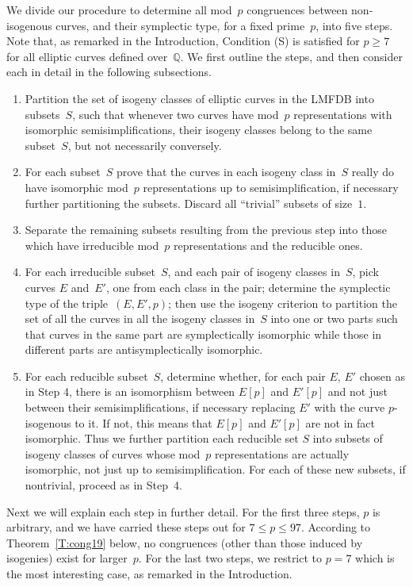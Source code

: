 \documentclass[twoside,leqno,symbols-for-thanks, draft]{rmi}
\numberwithin{equation}{section}
\newcommand{\Q}{\mathbb{Q}}
\theoremstyle{remark}
\begin{document}
We divide our procedure to determine all mod~$p$ congruences between
non-isogenous curves, and their symplectic type, for a fixed
prime~$p$, into five steps.  Note that, as remarked in the
Introduction, Condition (S) is satisfied for $p\ge7$ for all elliptic
curves defined over~$\Q$.  We first outline the steps, and then
consider each in detail in the following subsections.
\begin{enumerate}[1.]
\item Partition the set of isogeny classes of elliptic curves in the LMFDB
  into subsets~$S$, such that whenever two curves have mod~$p$
  representations with isomorphic semisimplifications, their isogeny
  classes belong to the same subset~$S$, but not necessarily
  conversely.
\item For each subset~$S$ prove that the curves in each isogeny class in~$S$ really
  do have isomorphic mod~$p$ representations up to
  semisimplification, if necessary further partitioning the subsets.
  Discard all ``trivial'' subsets of size~$1$.
\item Separate the remaining subsets resulting from the previous
  step into those which have irreducible mod~$p$ representations and
  the reducible ones.
\item For each irreducible subset~$S$, and each pair of isogeny
  classes in~$S$, pick curves $E$ and~$E'$, one from each class in the
  pair; determine the symplectic type of the triple~$(E,E',p)$; then
  use the isogeny criterion to partition the set of all the curves in
  all the isogeny classes in~$S$ into one or two parts such that curves
  in the same part are symplectically isomorphic while those in
  different parts are antisymplectically isomorphic.
\item For each reducible subset~$S$, determine whether, for each pair
  $E$, $E'$ chosen as in Step 4, there is an isomorphism between
  $E[p]$ and $E'[p]$ and not just between their semisimplifications,
  if necessary replacing $E'$ with the curve $p$-isogenous to it.  If
  not, this means that $E[p]$ and $E'[p]$ are not in fact isomorphic.
  Thus we further partition each reducible set $S$ into subsets of
  isogeny classes of curves whose mod~$p$ representations are actually
  isomorphic, not just up to semisimplification.  For each of these
  new subsets, if nontrivial, proceed as in Step~4.

\end{enumerate}
Next we will explain each step in further detail.  For the first three
steps, $p$ is arbitrary, and we have carried these steps out for $7\le
p\le97$.  According to Theorem~\ref{T:cong19} below, no congruences
(other than those induced by isogenies) exist for larger~$p$.  For the
last two steps, we restrict to $p=7$ which is the most interesting
case, as remarked in the Introduction.
\end{document}

